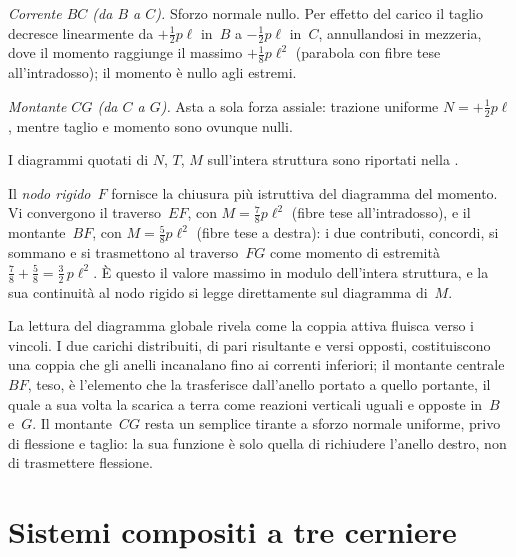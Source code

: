 \medskip
\noindent\textit{Corrente $BC$ (da $B$ a $C$).}
Sforzo normale nullo. Per effetto del carico il taglio
decresce linearmente da $+\tfrac12 p\ell$ in~$B$ a
$-\tfrac12 p\ell$ in~$C$, annullandosi in mezzeria, dove il
momento raggiunge il massimo $+\tfrac18 p\ell^2$ (parabola
con fibre tese all'intradosso); il momento è nullo agli
estremi.

\medskip
\noindent\textit{Montante $CG$ (da $C$ a $G$).}
Asta a sola forza assiale: trazione uniforme
$N = +\tfrac12 p\ell$, mentre taglio e momento sono
ovunque nulli.

I diagrammi quotati di $N$, $T$, $M$ sull'intera struttura
sono riportati nella .




\begin{oss}
	Il \emph{nodo rigido~$F$} fornisce la chiusura più
	istruttiva del diagramma del momento. Vi convergono il
	traverso~$EF$, con $M = \tfrac78 p\ell^2$ (fibre tese
	all'intradosso), e il montante~$BF$, con
	$M = \tfrac58 p\ell^2$ (fibre tese a destra): i due
	contributi, concordi, si sommano e si trasmettono al
	traverso~$FG$ come momento di estremità
	$\tfrac78 + \tfrac58 = \tfrac32\,p\ell^2$. È questo il
	valore massimo in modulo dell'intera struttura, e la sua
	continuità al nodo rigido si legge direttamente sul
	diagramma di~$M$.
\end{oss}

\begin{oss}
	La lettura del diagramma globale rivela come la coppia
	attiva fluisca verso i vincoli. I due carichi distribuiti,
	di pari risultante e versi opposti, costituiscono una
	coppia che gli anelli incanalano fino ai correnti
	inferiori; il montante centrale~$BF$, teso, è l'elemento
	che la trasferisce dall'anello portato a quello portante,
	il quale a sua volta la scarica a terra come reazioni
	verticali uguali e opposte in~$B$ e~$G$. Il montante~$CG$
	resta un semplice tirante a sforzo normale uniforme, privo
	di flessione e taglio: la sua funzione è solo quella di
	richiudere l'anello destro, non di trasmettere flessione.
\end{oss}

\section{Sistemi compositi a tre cerniere}
\label{sec:composito_tre_cerniere}

